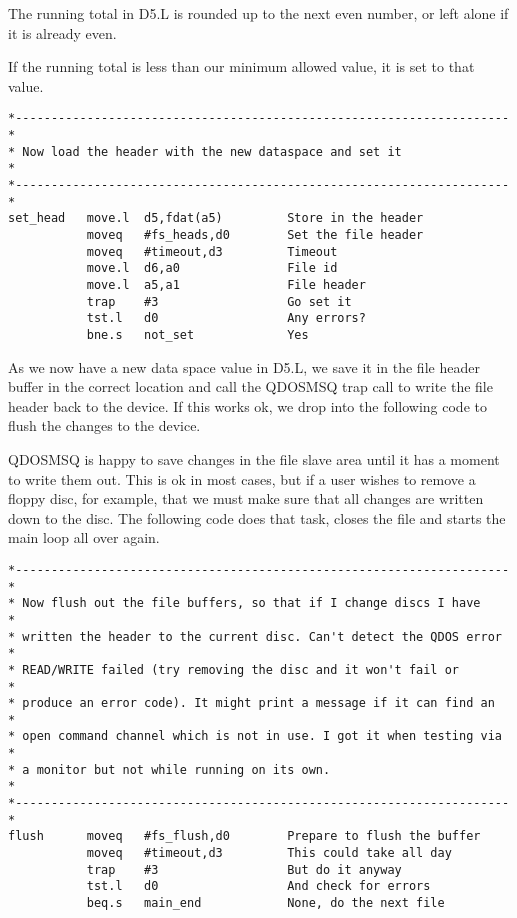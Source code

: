The running total in D5.L is rounded up to the next even number, or
    left alone if it is already even.

If the running total is less than our minimum allowed value, it is
    set to that value.

\begin{lstlisting}[firstnumber=last,caption={Dataspace Program - Part 11 - Write Header}]
*---------------------------------------------------------------------*
* Now load the header with the new dataspace and set it               *
*---------------------------------------------------------------------*
set_head   move.l  d5,fdat(a5)         Store in the header
           moveq   #fs_heads,d0        Set the file header
           moveq   #timeout,d3         Timeout
           move.l  d6,a0               File id
           move.l  a5,a1               File header
           trap    #3                  Go set it
           tst.l   d0                  Any errors?
           bne.s   not_set             Yes
\end{lstlisting}

As we now have a new data space value in D5.L, we save it in the
    file header buffer in the correct location and call the QDOSMSQ trap call
    to write the file header back to the device. If this works ok, we drop
    into the following code to flush the changes to the device.

QDOSMSQ is happy to save changes in the file slave area until it has
    a moment to write them out. This is ok in most cases, but if a user wishes
    to remove a floppy disc, for example, that we must make sure that all
    changes are written down to the disc. The following code does that task,
    closes the file and starts the main loop all over again.

\begin{lstlisting}[firstnumber=last,caption={Dataspace Program - Part 12 - Flush Buffers}]
*---------------------------------------------------------------------*
* Now flush out the file buffers, so that if I change discs I have    *
* written the header to the current disc. Can't detect the QDOS error *
* READ/WRITE failed (try removing the disc and it won't fail or       *
* produce an error code). It might print a message if it can find an  *
* open command channel which is not in use. I got it when testing via *
* a monitor but not while running on its own.                         *
*---------------------------------------------------------------------*
flush      moveq   #fs_flush,d0        Prepare to flush the buffer
           moveq   #timeout,d3         This could take all day
           trap    #3                  But do it anyway
           tst.l   d0                  And check for errors
           beq.s   main_end            None, do the next file
\end{lstlisting}

